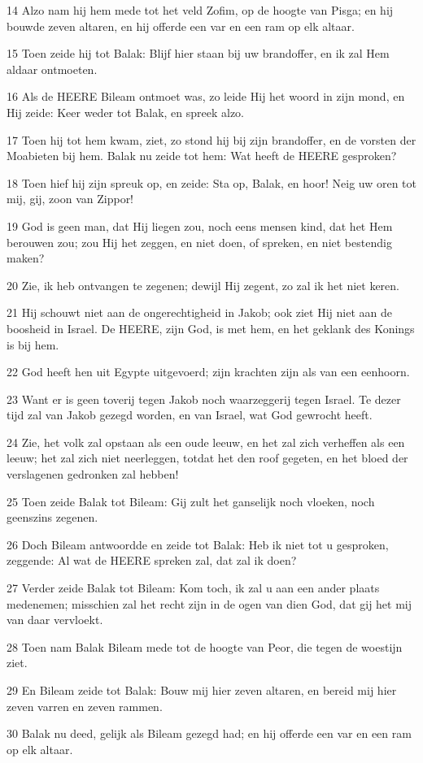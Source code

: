 \par 14 Alzo nam hij hem mede tot het veld Zofim, op de hoogte van Pisga; en hij bouwde zeven altaren, en hij offerde een var en een ram op elk altaar.
\par 15 Toen zeide hij tot Balak: Blijf hier staan bij uw brandoffer, en ik zal Hem aldaar ontmoeten.
\par 16 Als de HEERE Bileam ontmoet was, zo leide Hij het woord in zijn mond, en Hij zeide: Keer weder tot Balak, en spreek alzo.
\par 17 Toen hij tot hem kwam, ziet, zo stond hij bij zijn brandoffer, en de vorsten der Moabieten bij hem. Balak nu zeide tot hem: Wat heeft de HEERE gesproken?
\par 18 Toen hief hij zijn spreuk op, en zeide: Sta op, Balak, en hoor! Neig uw oren tot mij, gij, zoon van Zippor!
\par 19 God is geen man, dat Hij liegen zou, noch eens mensen kind, dat het Hem berouwen zou; zou Hij het zeggen, en niet doen, of spreken, en niet bestendig maken?
\par 20 Zie, ik heb ontvangen te zegenen; dewijl Hij zegent, zo zal ik het niet keren.
\par 21 Hij schouwt niet aan de ongerechtigheid in Jakob; ook ziet Hij niet aan de boosheid in Israel. De HEERE, zijn God, is met hem, en het geklank des Konings is bij hem.
\par 22 God heeft hen uit Egypte uitgevoerd; zijn krachten zijn als van een eenhoorn.
\par 23 Want er is geen toverij tegen Jakob noch waarzeggerij tegen Israel. Te dezer tijd zal van Jakob gezegd worden, en van Israel, wat God gewrocht heeft.
\par 24 Zie, het volk zal opstaan als een oude leeuw, en het zal zich verheffen als een leeuw; het zal zich niet neerleggen, totdat het den roof gegeten, en het bloed der verslagenen gedronken zal hebben!
\par 25 Toen zeide Balak tot Bileam: Gij zult het ganselijk noch vloeken, noch geenszins zegenen.
\par 26 Doch Bileam antwoordde en zeide tot Balak: Heb ik niet tot u gesproken, zeggende: Al wat de HEERE spreken zal, dat zal ik doen?
\par 27 Verder zeide Balak tot Bileam: Kom toch, ik zal u aan een ander plaats medenemen; misschien zal het recht zijn in de ogen van dien God, dat gij het mij van daar vervloekt.
\par 28 Toen nam Balak Bileam mede tot de hoogte van Peor, die tegen de woestijn ziet.
\par 29 En Bileam zeide tot Balak: Bouw mij hier zeven altaren, en bereid mij hier zeven varren en zeven rammen.
\par 30 Balak nu deed, gelijk als Bileam gezegd had; en hij offerde een var en een ram op elk altaar.


